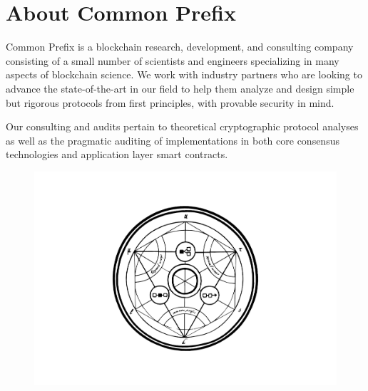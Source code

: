 \section*{About Common Prefix}

Common Prefix is a blockchain research, development, and consulting
company consisting of a small number of scientists and engineers
specializing in many aspects of blockchain science.
We work with industry partners who are looking to advance the state-of-the-art
in our field to help them analyze and design simple but rigorous protocols
from first principles, with provable security in mind.

Our consulting and audits pertain to theoretical cryptographic
protocol analyses as well as the pragmatic auditing of implementations
in both core consensus technologies and application layer smart contracts.

\begin{figure}
    \center
    \includegraphics[width=0.7\columnwidth]{figures/logo.png}
    \label{fig:cp_logo}
\end{figure}
